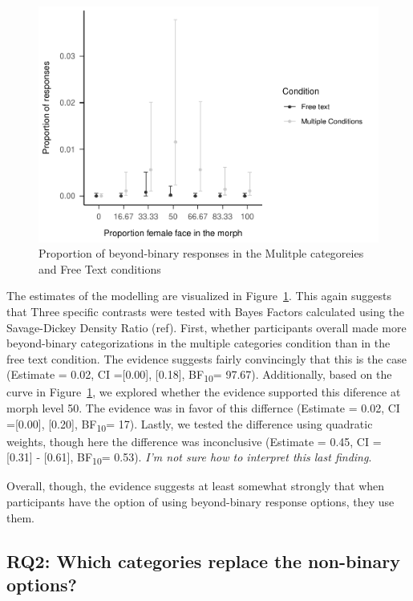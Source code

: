 \documentclass[
  man]{apa7}
\begin{document}
\begin{figure}
\centering
\includegraphics{resp_opts_manus23022_files/figure-latex/exp-one-inf-1.pdf}
\caption{\label{fig:exp-one-inf}Proportion of beyond-binary responses in the Mulitple categoreies and Free Text conditions}
\end{figure}

The estimates of the modelling are visualized in Figure~\ref{fig:exp-one-inf}. This again suggests that Three specific contrasts were tested with Bayes Factors calculated using the Savage-Dickey Density Ratio (ref). First, whether participants overall made more beyond-binary categorizations in the multiple categories condition than in the free text condition. The evidence suggests fairly convincingly that this is the case (Estimate = 0.02, CI ={[}0.00{]}, {[}0.18{]}, BF\textsubscript{10}= 97.67). Additionally, based on the curve in Figure~\ref{fig:exp-one-inf}, we explored whether the evidence supported this diference at morph level 50. The evidence was in favor of this differnce (Estimate = 0.02, CI ={[}0.00{]}, {[}0.20{]}, BF\textsubscript{10}= 17). Lastly, we tested the difference using quadratic weights, though here the difference was inconclusive (Estimate = 0.45, CI = {[}0.31{]} - {[}0.61{]}, BF\textsubscript{10}= 0.53). \emph{I'm not sure how to interpret this last finding}.

Overall, though, the evidence suggests at least somewhat strongly that when participants have the option of using beyond-binary response options, they use them.

\hypertarget{rq2-which-categories-replace-the-non-binary-options}{%
\subsection{RQ2: Which categories replace the non-binary options?}\label{rq2-which-categories-replace-the-non-binary-options}}
\end{document}
